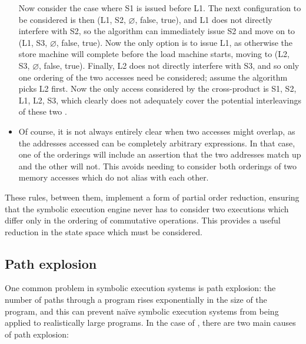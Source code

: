 \begin{itemize}
  Now consider the case where S1 is issued before L1.  The next
  configuration to be considered is then (L1, S2, $\varnothing$,
  false, true), and L1 does not directly interfere with S2, so the
  algorithm can immediately issue S2 and move on to (L1, S3,
  $\varnothing$, false, true).  Now the only option is to issue L1, as
  otherwise the store machine will complete before the load machine
  starts, moving to (L2, S3, $\varnothing$, false, true).  Finally, L2
  does not directly interfere with S3, and so only one ordering of the
  two accesses need be considered; assume the algorithm picks L2
  first.  Now the only access considered by the cross-product
  {\StateMachine} is S1, S2, L1, L2, S3, which clearly does not
  adequately cover the potential interleavings of these two
  {\StateMachines}.
\item
  Of course, it is not always entirely clear when two accesses might
  overlap, as the addresses accessed can be completely arbitrary
  expressions.  In that case, one of the orderings will include an
  assertion that the two addresses match up and the other will not.
  This avoids needing to consider both orderings of two memory
  accesses which do not alias with each other.

\end{itemize}

These rules, between them, implement a form of partial order
reduction\needCite{}, ensuring that the symbolic execution engine
never has to consider two executions which differ only in the ordering
of commutative operations.  This provides a useful reduction in the
state space which must be considered.

\subsection{Path explosion}

One common problem in symbolic execution systems is path explosion:
the number of paths through a program rises exponentially in the size
of the program, and this can prevent na\"ive symbolic execution
systems from being applied to realistically large programs.  In the
case of \technique, there are two main causes of path explosion:

